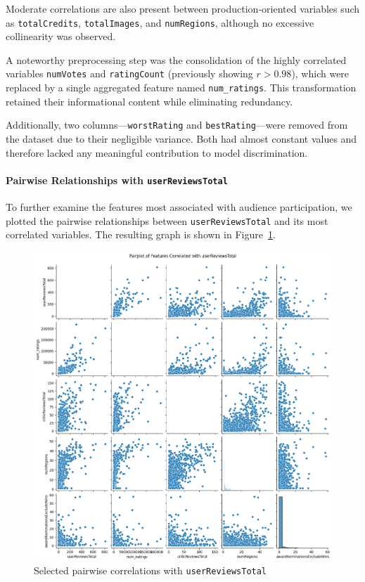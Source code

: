 \documentclass[10pt]{article}
\begin{document}
Moderate correlations are also present between production-oriented variables such as \texttt{totalCredits}, \texttt{totalImages}, and \texttt{numRegions}, although no excessive collinearity was observed.

A noteworthy preprocessing step was the consolidation of the highly correlated variables \texttt{numVotes} and \texttt{ratingCount} (previously showing $r > 0.98$), which were replaced by a single aggregated feature named \texttt{num\_ratings}. This transformation retained their informational content while eliminating redundancy. 

Additionally, two columns—\texttt{worstRating} and \texttt{bestRating}—were removed from the dataset due to their negligible variance. Both had almost constant values and therefore lacked any meaningful contribution to model discrimination.

\paragraph{Pairwise Relationships with \texttt{userReviewsTotal}}

To further examine the features most associated with audience participation, we plotted the pairwise relationships between \texttt{userReviewsTotal} and its most correlated variables. The resulting graph is shown in Figure~\ref{fig:pairplot-userreviews}.

\begin{figure}[H]
\centering
\includegraphics[width=0.95\linewidth]{pairplot_user.png}
\caption{Selected pairwise correlations with \texttt{userReviewsTotal}}
\label{fig:pairplot-userreviews}
\end{figure}
\end{document}
